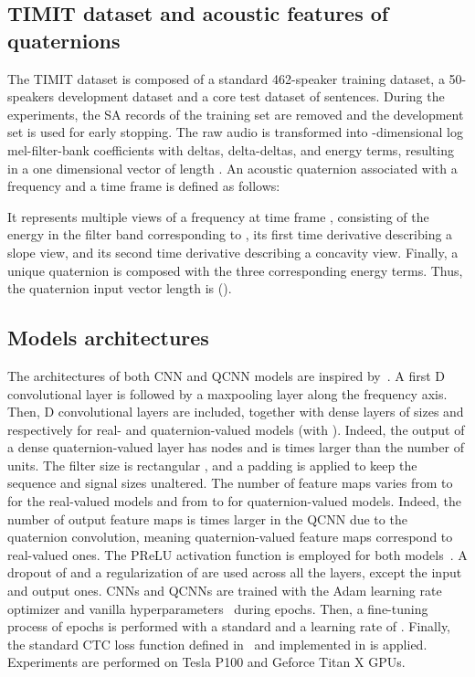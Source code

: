 \documentclass[a4paper]{article}
\begin{document}
\subsection{TIMIT dataset and acoustic features of quaternions}
\label{sec:dataset}
The TIMIT \cite{garofolo1993darpa} dataset is composed of a standard 462-speaker training dataset, a 50-speakers development dataset and a core test dataset of  sentences. During the experiments, the SA records of the training set are removed and the development set is used for early stopping. The raw audio is transformed into -dimensional log mel-filter-bank coefficients with deltas, delta-deltas, and energy terms, resulting in a one dimensional vector of length . An acoustic quaternion  associated with a frequency  and a time frame  is defined as follows:

It represents multiple views of a frequency  at time frame , consisting of the energy  in the filter band corresponding to , its first time derivative describing a slope view, and its second time derivative describing a concavity view. Finally, a unique quaternion is composed with the three corresponding energy terms. Thus, the quaternion input vector length is  (). 



\subsection{Models architectures}
\label{sec:model}
The architectures of both CNN and QCNN models are inspired by~\cite{zhang2017towards}. A first D convolutional layer is followed by a maxpooling layer along the frequency axis. Then,  D convolutional layers are included, together with  dense layers of sizes  and  respectively for real- and quaternion-valued models (with ). Indeed, the output of a dense quaternion-valued layer has  nodes and is  times larger than the number of units.
The filter size is rectangular , and a padding is applied to keep the sequence and signal sizes unaltered. The number of feature maps varies from  to  for the real-valued models and from  to  for quaternion-valued models. Indeed, the number of output feature maps is  times larger in the QCNN due to the quaternion convolution, meaning  quaternion-valued feature maps correspond to  real-valued ones. The PReLU activation function is employed for both models~\cite{he2015delving}. A dropout of  and a  regularization of  are used across all the layers, except the input and output ones. CNNs and QCNNs are trained with the Adam learning rate optimizer and vanilla hyperparameters~\cite{kingma2014adam} during  epochs. Then, a fine-tuning process of  epochs is performed with a standard  and a learning rate of . Finally, the standard CTC loss function defined in~\cite{graves2006connectionist} and implemented in \cite{chollet2015keras} is applied. Experiments are performed on Tesla P100 and Geforce Titan X GPUs. 
\end{document}

